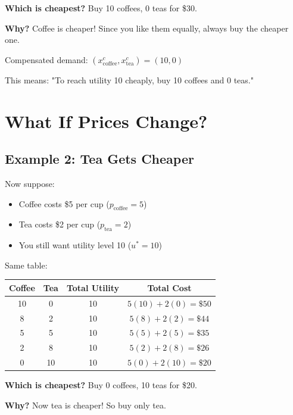 \documentclass[11pt]{article}
\begin{document}
\textbf{Which is cheapest?} Buy 10 coffees, 0 teas for \$30.

\textbf{Why?} Coffee is cheaper! Since you like them equally, always buy the cheaper one.

\begin{tcolorbox}[colback=yellow!10!white,colframe=orange!75!black,title=The Answer for This Example]
Compensated demand: $(x_{\text{coffee}}^c, x_{\text{tea}}^c) = (10, 0)$

This means: "To reach utility 10 cheaply, buy 10 coffees and 0 teas."
\end{tcolorbox}

\section{What If Prices Change?}

\subsection{Example 2: Tea Gets Cheaper}

Now suppose:
\begin{itemize}
\item Coffee costs \$5 per cup ($p_{\text{coffee}} = 5$)
\item Tea costs \$2 per cup ($p_{\text{tea}} = 2$)
\item You still want utility level 10 ($u^* = 10$)
\end{itemize}

Same table:

\begin{center}
\begin{tabular}{|c|c|c|c|}
\hline
\textbf{Coffee} & \textbf{Tea} & \textbf{Total Utility} & \textbf{Total Cost} \\
\hline
10 & 0 & 10 & $5(10) + 2(0) = \$50$ \\
8 & 2 & 10 & $5(8) + 2(2) = \$44$ \\
5 & 5 & 10 & $5(5) + 2(5) = \$35$ \\
2 & 8 & 10 & $5(2) + 2(8) = \$26$ \\
0 & 10 & 10 & $5(0) + 2(10) = \$20$ \\
\hline
\end{tabular}
\end{center}

\textbf{Which is cheapest?} Buy 0 coffees, 10 teas for \$20.

\textbf{Why?} Now tea is cheaper! So buy only tea.
\end{document}
